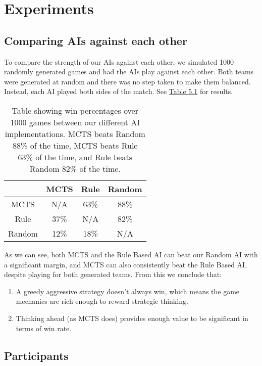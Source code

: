 \chapter{Experiments}
\label{chapter05}

\section{Comparing AIs against each other}

To compare the strength of our AIs against each other, we simulated 1000 randomly generated games
and had the AIs play against each other. Both teams were generated at random and there was no step taken
to make them balanced. Instead, each AI played both sides of the match. See \hyperref[tab:winrates]{Table 5.1} for results.

\begin{table}[h]
	\centering
	\begin{tabular}{|| c | c c c ||}
		\hline
		& MCTS & Rule & Random \\
		\hline\hline
		MCTS & N/A & 63\% & 88\% \\
		Rule & 37\%& N/A & 82\% \\
		Random & 12\% & 18\% & N/A \\
		\hline
	\end{tabular}
	\label{tab:winrates}
	\caption{Table showing win percentages over 1000 games between our different AI implementations.
	MCTS beats Random 88\% of the time, MCTS beats Rule 63\% of the time, and Rule beats Random 82\% of the time.}
\end{table}

As we can see, both MCTS and the Rule Based AI can beat our Random AI with a significant margin,
and MCTS can also consistently beat the Rule Based AI, despite playing for both generated teams.
From this we conclude that:

\begin{enumerate}
	\item A greedy aggressive strategy doesn't always win, which means the game mechanics are rich enough
	to reward strategic thinking.
	\item Thinking ahead (as MCTS does) provides enough value to be significant in terms of win rate.
\end{enumerate}


\section{Participants}


